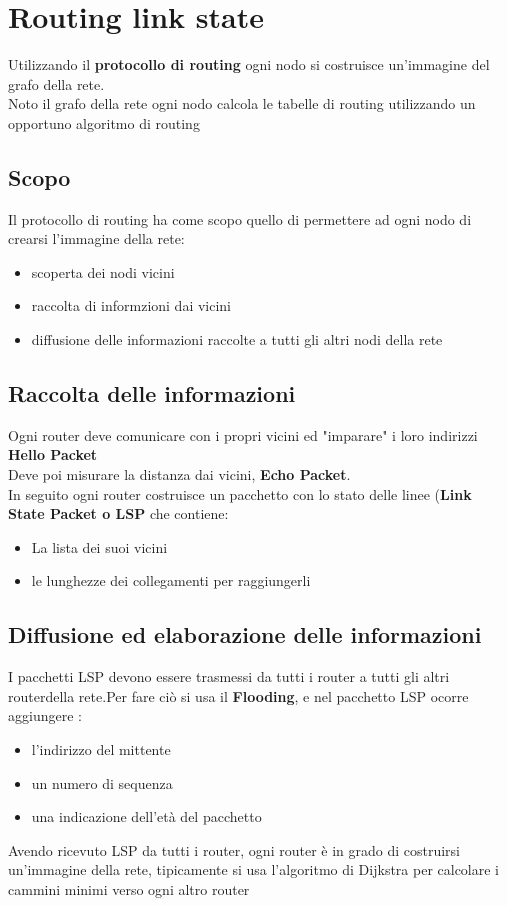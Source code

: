 \documentclass{report}
\begin{document}
        \section{Routing link state}
            Utilizzando il \textbf{protocollo di routing} ogni nodo si costruisce un'immagine del grafo della rete.
            \\
            Noto il grafo della rete ogni nodo calcola le tabelle di routing utilizzando un opportuno algoritmo di routing
            \subsection{Scopo}
                Il protocollo di routing ha come scopo quello di permettere ad ogni nodo di crearsi l'immagine della rete:
                \begin{itemize}
                    \item scoperta dei nodi vicini
                    \item raccolta di informzioni dai vicini
                    \item diffusione delle informazioni raccolte a tutti gli altri nodi della rete
                \end{itemize}
            \subsection{Raccolta delle informazioni}
                Ogni router deve comunicare con i propri vicini ed "imparare" i loro indirizzi \textbf{Hello Packet}
                \\
                Deve poi misurare la distanza dai vicini, \textbf{Echo Packet}.
                \\
                In seguito ogni router costruisce un pacchetto con lo stato delle linee (\textbf{Link State Packet o LSP} che contiene:
                \begin{itemize}
                    \item La lista dei suoi vicini
                    \item le lunghezze dei collegamenti per raggiungerli
                \end{itemize}
            \subsection{Diffusione ed elaborazione delle informazioni}
                I pacchetti LSP devono essere trasmessi da tutti i router a tutti gli altri routerdella rete.Per fare ciò si usa il \textbf{Flooding}, e nel pacchetto LSP ocorre aggiungere :
                \begin{itemize}
                    \item l'indirizzo del mittente
                    \item un numero di sequenza 
                    \item una indicazione dell'età del pacchetto
                \end{itemize}
                Avendo ricevuto LSP da tutti i router, ogni router è in grado di costruirsi un'immagine della rete, tipicamente si usa l'algoritmo di Dijkstra per calcolare i cammini minimi verso ogni altro router
\end{document}
